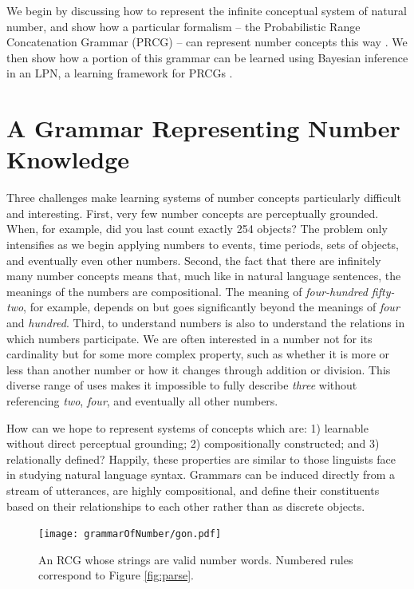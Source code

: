 \documentclass[10pt,letterpaper]{article}
\begin{document}
We begin by discussing how to represent the infinite conceptual system
of natural number, and show how a particular formalism -- the
Probabilistic Range Concatenation Grammar (PRCG) -- can represent
number concepts this way \citep{boullier2005range}. We then show how a
portion of this grammar can be learned using Bayesian inference in an
LPN, a learning framework for PRCGs \citep{DecRulTen2015}.

\section{A Grammar Representing Number Knowledge}

Three challenges make learning systems of number concepts particularly
difficult and interesting. First, very few number concepts are
perceptually grounded. When, for example, did you last count exactly
254 objects? The problem only intensifies as we begin applying numbers
to events, time periods, sets of objects, and eventually even other
numbers. Second, the fact that there are infinitely many number
concepts means that, much like in natural language sentences, the
meanings of the numbers are compositional. The meaning of
\emph{four-hundred fifty-two}, for example, depends on but goes
significantly beyond the meanings of \emph{four} and \emph{hundred}.
Third, to understand numbers is also to understand the relations in
which numbers participate. We are often interested in a number not for
its cardinality but for some more complex property, such as whether it
is more or less than another number or how it changes through addition
or division. This diverse range of uses makes it impossible to fully
describe \emph{three} without referencing \emph{two}, \emph{four}, and
eventually all other numbers.

How can we hope to represent systems of concepts which are: 1)
learnable without direct perceptual grounding; 2) compositionally
constructed; and 3) relationally defined? Happily, these properties
are similar to those linguists face in studying natural language
syntax. Grammars can be induced directly from a stream of utterances,
are highly compositional, and define their constituents based on their
relationships to each other rather than as discrete objects.

\begin{figure}[t]
  \begin{centering}
    \texttt{[image: grammarOfNumber/gon.pdf]}
    \caption{An RCG whose strings are valid number words. Numbered rules correspond to Figure \ref{fig:parse}.}
    \label{fig:gon}
  \end{centering}
\end{figure}
\end{document}
